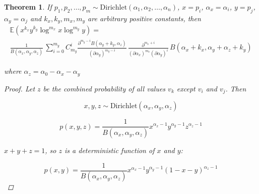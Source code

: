 \documentclass{article}
\begin{document}
\newtheorem{theorem}{Theorem}
\begin{theorem}
	If $p_1, p_2, \ldots, p_m \sim \textrm{Dirichlet}(\alpha_1, \alpha_2, \ldots, \alpha_n)$, $x = p_i$, $\alpha_x = \alpha_i$, $y = p_j$, $\alpha_y = \alpha_j$ and $k_x, k_y, m_x, m_y$ are arbitrary positive constants, then 
	\begin{multline}
	\mathbb{E}(x^{k_x} y^{k_y} \log^{m_x} x \log^{m_y} y) = \\ \frac{1}{B(\alpha_x, \alpha_y, \alpha_z)} \,  \sum_{i=0}^{m_y}{ C^i_{m_y} \frac{\partial^{m_y-i} B(\alpha_y + k_y, \alpha_z)}{(\partial \alpha_y)^{m_y-i}} \, \frac{\partial^{m_x + i}}{(\partial \alpha_x)^{m_x} (\partial \alpha_y)^{i}} \, B(\alpha_x + k_x, \alpha_y + \alpha_z + k_y)}
	\end{multline}
	
	where $\alpha_z = \alpha_0 - \alpha_x - \alpha_y$
	\begin{proof}
		Let $z$ be the combined probability of all values $v_k$ except $v_i$ and $v_j$. Then
		
		\begin{equation*}
		x, y, z \sim \textrm{Dirichlet}(\alpha_x, \alpha_y, \alpha_z)
		\end{equation*}
		
		\begin{equation}
		p(x, y, z) = \frac{1}{B(\alpha_x, \alpha_y, \alpha_z)} x^{\alpha_x - 1} y^{\alpha_y - 1} z^{\alpha_z - 1}
		\end{equation}
		
		
		$x + y + z = 1$, so $z$ is a deterministic function of $x$ and $y$: 
		
		\begin{equation}
		p(x, y) = \frac{1}{B(\alpha_x, \alpha_y, \alpha_z)} x^{\alpha_x - 1} y^{\alpha_y - 1} (1 - x - y)^{\alpha_z - 1}
		\end{equation}
		

\end{proof}
\end{theorem}
\end{document}
